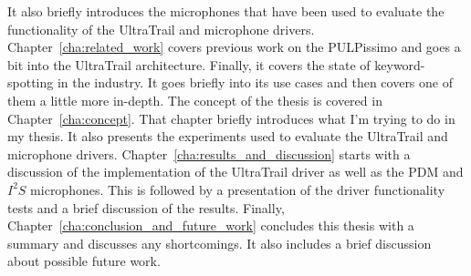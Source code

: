 It also briefly introduces the microphones that have been used to evaluate the functionality of the UltraTrail and microphone drivers.\\
Chapter~\ref{cha:related_work} covers previous work on the PULPissimo \cite{pulpissimo} and goes a bit into the UltraTrail architecture.
Finally, it covers the state of keyword-spotting in the industry.
It goes briefly into its use cases and then covers one of them a little more in-depth.
The concept of the thesis is covered in Chapter~\ref{cha:concept}.
That chapter briefly introduces what I'm trying to do in my thesis.
It also presents the experiments used to evaluate the UltraTrail and microphone drivers.
Chapter~\ref{cha:results_and_discussion} starts with a discussion of the implementation
of the UltraTrail driver as well as the PDM and $I^2S$ microphones.
This is followed by a presentation of the driver functionality tests and a brief discussion of the results.
Finally, Chapter~\ref{cha:conclusion_and_future_work} concludes this thesis with a summary and discusses any shortcomings.
It also includes a brief discussion about possible future work.
